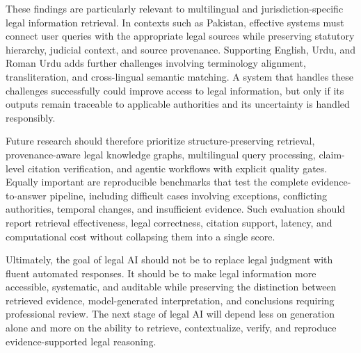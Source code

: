 These findings are particularly relevant to multilingual and jurisdiction-specific legal information
retrieval. In contexts such as Pakistan, effective systems must connect user queries with the appropriate
legal sources while preserving statutory hierarchy, judicial context, and source provenance. Supporting
English, Urdu, and Roman Urdu adds further challenges involving terminology alignment, transliteration,
and cross-lingual semantic matching. A system that handles these challenges successfully could improve
access to legal information, but only if its outputs remain traceable to applicable authorities and its
uncertainty is handled responsibly.

Future research should therefore prioritize structure-preserving retrieval, provenance-aware legal
knowledge graphs, multilingual query processing, claim-level citation verification, and agentic workflows
with explicit quality gates. Equally important are reproducible benchmarks that test the complete
evidence-to-answer pipeline, including difficult cases involving exceptions, conflicting authorities,
temporal changes, and insufficient evidence. Such evaluation should report retrieval effectiveness, legal
correctness, citation support, latency, and computational cost without collapsing them into a single
score.

Ultimately, the goal of legal AI should not be to replace legal judgment with fluent automated responses.
It should be to make legal information more accessible, systematic, and auditable while preserving the
distinction between retrieved evidence, model-generated interpretation, and conclusions requiring
professional review. The next stage of legal AI will depend less on generation alone and more on the
ability to retrieve, contextualize, verify, and reproduce evidence-supported legal reasoning.
